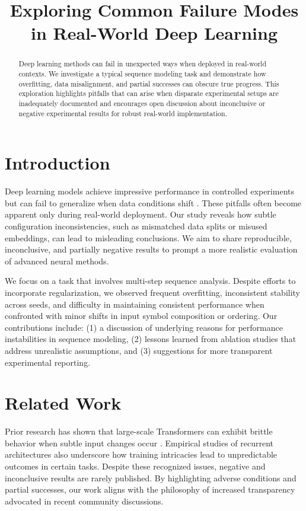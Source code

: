 \documentclass[11pt,onecolumn]{article}
\title{\vspace{-2em}Exploring Common Failure Modes in Real-World Deep Learning\vspace{-0.5em}}
\date{}
\begin{document}
\maketitle

\begin{abstract}
Deep learning methods can fail in unexpected ways when deployed in real-world contexts. We investigate a typical sequence modeling task and demonstrate how overfitting, data misalignment, and partial successes can obscure true progress. This exploration highlights pitfalls that can arise when disparate experimental setups are inadequately documented and encourages open discussion about inconclusive or negative experimental results for robust real-world implementation.
\end{abstract}

\section{Introduction}
Deep learning models achieve impressive performance in controlled experiments but can fail to generalize when data conditions shift \citep{t5}. These pitfalls often become apparent only during real-world deployment. Our study reveals how subtle configuration inconsistencies, such as mismatched data splits or misused embeddings, can lead to misleading conclusions. We aim to share reproducible, inconclusive, and partially negative results to prompt a more realistic evaluation of advanced neural methods.

We focus on a task that involves multi-step sequence analysis. Despite efforts to incorporate regularization, we observed frequent overfitting, inconsistent stability across seeds, and difficulty in maintaining consistent performance when confronted with minor shifts in input symbol composition or ordering. Our contributions include:
(1) a discussion of underlying reasons for performance instabilities in sequence modeling, (2) lessons learned from ablation studies that address unrealistic assumptions, and (3) suggestions for more transparent experimental reporting.

\section{Related Work}
Prior research has shown that large-scale Transformers can exhibit brittle behavior when subtle input changes occur \citep{t5}. Empirical studies of recurrent architectures also underscore how training intricacies lead to unpredictable outcomes in certain tasks. Despite these recognized issues, negative and inconclusive results are rarely published. By highlighting adverse conditions and partial successes, our work aligns with the philosophy of increased transparency advocated in recent community discussions.
\end{document}
